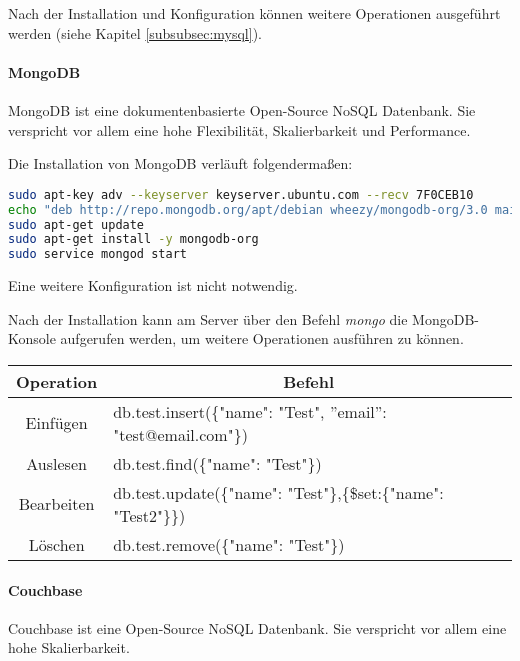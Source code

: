 Nach der Installation und Konfiguration können weitere Operationen ausgeführt werden (siehe Kapitel \ref{subsubsec:mysql}).

\paragraph{MongoDB}
MongoDB ist eine dokumentenbasierte Open-Source NoSQL Datenbank. Sie verspricht vor allem eine hohe Flexibilität, Skalierbarkeit und Performance. \cite{ABOUTMONGODB}

Die Installation von MongoDB verläuft folgendermaßen:
\begin{lstlisting}[caption=Installation von MongoDB \cite{MONGODBINSTALL}, language=bash]
sudo apt-key adv --keyserver keyserver.ubuntu.com --recv 7F0CEB10
echo "deb http://repo.mongodb.org/apt/debian wheezy/mongodb-org/3.0 main" | sudo tee /etc/apt/sources.list.d/mongodb-org-3.0.list
sudo apt-get update
sudo apt-get install -y mongodb-org
sudo service mongod start
\end{lstlisting}
Eine weitere Konfiguration ist nicht notwendig.

\newpage

Nach der Installation kann am Server über den Befehl \textit{mongo}  die MongoDB-Konsole aufgerufen werden, um weitere Operationen ausführen zu können.

\begin{table}[htb]
\def\arraystretch{1.3}
\centering
\begin{tabular}{|c|l|}
\hline
\textbf{Operation} & \multicolumn{1}{c|}{\textbf{Befehl}}                            \\ \hline
Einfügen           & db.test.insert(\{"name": "Test", ''email'': "test@email.com"\})                    \\ \hline
Auslesen           & db.test.find(\{"name": "Test"\}) \\ \hline
Bearbeiten         & db.test.update(\{"name": "Test"\},\{\$set:\{"name": "Test2"\}\}) \\ \hline
Löschen            & db.test.remove(\{"name": "Test"\}) \\ \hline
\end{tabular}
\end{table}

\paragraph{Couchbase}
Couchbase ist eine Open-Source NoSQL Datenbank. Sie verspricht vor allem eine hohe Skalierbarkeit.\cite{ABOUTCOUCHBASE}

